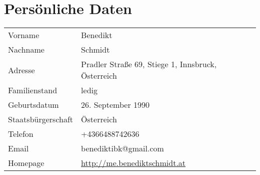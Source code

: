 


\section*{Persönliche Daten}
\begin{tabularx}{\textwidth}{l|l}
Vorname & Benedikt \\
Nachname & Schmidt \\
Adresse & Pradler Straße 69, Stiege 1, Innsbruck, Österreich \\
Familienstand & ledig \\
Geburtsdatum & 26. September 1990 \\
Staatsbürgerschaft & Österreich \\
Telefon & +4366488742636 \\
Email & benediktibk@gmail.com \\
Homepage & \url{http://me.benediktschmidt.at}
\end{tabularx}

